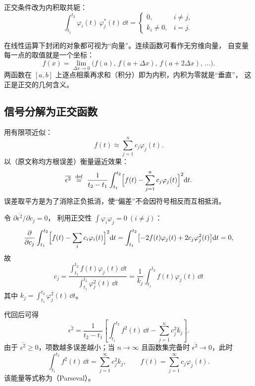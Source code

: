 \quad 正交条件改为内积取共轭：
\[
    \int_{t_1}^{t_2}\varphi_i(t)\,\varphi_j^{*}(t)\,\dd t=
    \begin{cases}
        0, & i\neq j,\\[2pt]
        k_i\neq 0, & i=j .
    \end{cases}
\]

\begin{note}

在线性运算下封闭的对象都可视为“向量”。连续函数可看作无穷维向量，
自变量每一点的取值就是一个坐标：
\[
    f(x)=\lim_{\Delta x\to 0}\bigl(f(a),\,f(a+\Delta x),\,f(a+2\Delta x),\,\dots\bigr).
\]
两函数在 $[a,b]$ 上逐点相乘再求和（积分）即为内积，内积为零就是“垂直”，
这正是正交的几何含义。
\end{note}

\subsection{信号分解为正交函数}

用有限项近似：
\[
    f(t)\approx\sum_{j=1}^{n}c_j\varphi_j(t).
\]
以（原文称均方根误差）衡量逼近效果：
\[
    \overline{\epsilon^{2}}\ \overset{\mathrm{def}}{=}\
    \frac{1}{t_2-t_1}\int_{t_1}^{t_2}
    \Bigl[f(t)-\sum_{j=1}^{n}c_j\varphi_j(t)\Bigr]^{2}\dd t .
\]
误差取平方是为了消除正负抵消，使“偏差”不会因符号相反而互相抵消。

\quad 令 $\partial\overline{\epsilon^{2}}/\partial c_j=0$，
利用正交性 $\int\varphi_i\varphi_j=0\ (i\neq j)$：
\[
    \frac{\partial}{\partial c_j}\int_{t_1}^{t_2}
    \Bigl[f(t)-\sum_{i}c_i\varphi_i(t)\Bigr]^{2}\mathrm{d} t
    =\int_{t_1}^{t_2}\bigl[-2f(t)\varphi_j(t)+2c_j\varphi_j^{2}(t)\bigr]\mathrm{d} t=0,
\]
故
\[
    \boxed{\;
    c_j=\frac{\displaystyle\int_{t_1}^{t_2}f(t)\varphi_j(t)\,\dd t}
             {\displaystyle\int_{t_1}^{t_2}\varphi_j^{2}(t)\,\dd t}
       =\frac{1}{k_j}\int_{t_1}^{t_2}f(t)\varphi_j(t)\,\dd t\;}
\]
其中 $k_j=\displaystyle\int_{t_1}^{t_2}\varphi_j^{2}(t)\,\dd t$。

\quad 代回后可得
\[
    \overline{\epsilon^{2}}=\frac{1}{t_2-t_1}
    \left[\int_{t_1}^{t_2}f^{2}(t)\,\dd t-\sum_{j=1}^{n}c_j^{2}k_j\right].
\]
由于 $\overline{\epsilon^{2}}\ge 0$，项数越多误差越小；当 $n\to\infty$ 且函数集完备时
$\overline{\epsilon^{2}}\to 0$，此时
\[
    \int_{t_1}^{t_2}f^{2}(t)\,\dd t=\sum_{j=1}^{\infty}c_j^{2}k_j,
    \qquad
    f(t)=\sum_{j=1}^{\infty}c_j\varphi_j(t).
\]
该能量等式称为（Parseval）。

